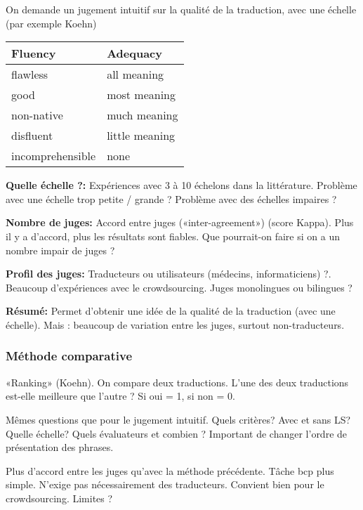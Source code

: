On demande un jugement intuitif sur la qualité de la traduction, avec une échelle (par exemple Koehn)

\begin{table}[H]
    \centering
    \begin{tabular}{|l|l|}
    \hline
    \textbf{Fluency} & \textbf{Adequacy}       \\ \hline
    flawless         & all meaning             \\ \hline
    good             & most meaning            \\ \hline
    non-native       & much meaning            \\ \hline
    disfluent        & little meaning          \\ \hline
    incomprehensible & none                    \\ \hline
    \end{tabular}
\end{table}


\textbf{Quelle échelle ?:}
Expériences avec 3 à 10 échelons dans la littérature. Problème avec une échelle trop petite / grande ? Problème avec des échelles impaires ?

\textbf{Nombre de juges:}
Accord entre juges («inter-agreement») (score Kappa). Plus il y a d’accord, plus les résultats sont fiables. Que pourrait-on faire si on a un nombre impair de juges ?

\textbf{Profil des juges:}
Traducteurs ou utilisateurs (médecins, informaticiens) ?. Beaucoup d’expériences avec le crowdsourcing. Juges monolingues ou bilingues ?

\textbf{Résumé:}
Permet d’obtenir une idée de la qualité de la traduction (avec une échelle). Mais : beaucoup de variation entre les juges, surtout non-traducteurs.

\subsubsection{Méthode comparative}

«Ranking» (Koehn).
On compare deux traductions. L’une des deux traductions est-elle meilleure que l’autre ? Si oui = 1, si non = 0.

Mêmes questions que pour le jugement intuitif. Quels critères? Avec et sans LS? Quelle échelle? Quels évaluateurs et combien ? Important de changer l’ordre de présentation des phrases.

Plus d’accord entre les juges qu’avec la méthode précédente. Tâche bcp plus simple. N’exige pas nécessairement des traducteurs. Convient bien pour le crowdsourcing. Limites ?

